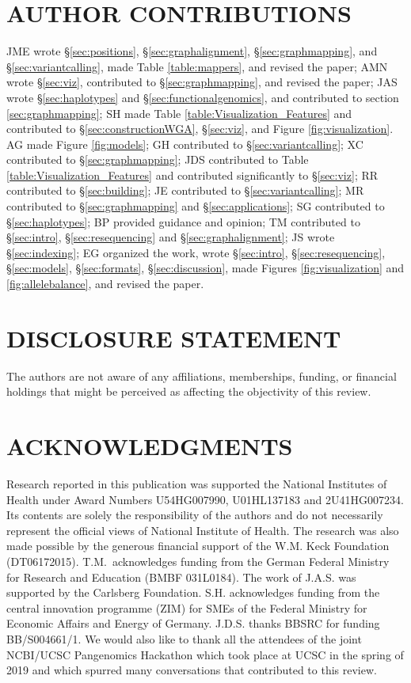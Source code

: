

\section*{AUTHOR CONTRIBUTIONS}

JME wrote \S \ref{sec:positions}, \S \ref{sec:graphalignment}, \S \ref{sec:graphmapping}, and \S \ref{sec:variantcalling}, made Table \ref{table:mappers}, and revised the paper;
AMN wrote \S \ref{sec:viz}, contributed to \S \ref{sec:graphmapping}, and revised the paper;
JAS wrote \S \ref{sec:haplotypes} and \S \ref{sec:functionalgenomics}, and contributed to section \ref{sec:graphmapping};
SH made Table \ref{table:Visualization_Features} and contributed to \S \ref{sec:constructionWGA}, \S \ref{sec:viz}, and Figure \ref{fig:visualization}.
AG made Figure \ref{fig:models};
GH contributed to \S \ref{sec:variantcalling};
XC contributed to \S \ref{sec:graphmapping};
JDS contributed to Table \ref{table:Visualization_Features} and contributed significantly to \S \ref{sec:viz};
RR contributed to \S \ref{sec:building};
JE contributed to \S \ref{sec:variantcalling};
MR contributed to \S \ref{sec:graphmapping} and \S \ref{sec:applications};
SG contributed to \S \ref{sec:haplotypes};
BP provided guidance and opinion;
TM contributed to \S \ref{sec:intro}, \S \ref{sec:resequencing} and \S \ref{sec:graphalignment};
JS wrote \S \ref{sec:indexing};
EG organized the work, wrote \S \ref{sec:intro}, \S \ref{sec:resequencing}, \S \ref{sec:models}, \S \ref{sec:formats}, \S \ref{sec:discussion}, made Figures \ref{fig:visualization} and \ref{fig:allelebalance}, and revised the paper.

\section*{DISCLOSURE STATEMENT}
The authors are not aware of any affiliations, memberships, funding, or financial holdings that
might be perceived as affecting the objectivity of this review. 

\section*{ACKNOWLEDGMENTS}
Research reported in this publication was supported the National Institutes of Health under Award Numbers U54HG007990, U01HL137183 and 2U41HG007234.
Its contents are solely the responsibility of the authors and do not necessarily represent the official views of National Institute of Health.
The research was also made possible by the generous financial support of the W.M. Keck Foundation (DT06172015).
T.M.\ acknowledges funding from the German Federal Ministry for Research and Education (BMBF 031L0184).
The work of J.A.S. was supported by the Carlsberg Foundation.
S.H. acknowledges funding from the central innovation programme (ZIM) for SMEs of the Federal Ministry for Economic Affairs and Energy of Germany.
J.D.S. thanks BBSRC for funding BB/S004661/1.
We would also like to thank all the attendees of the joint NCBI/UCSC Pangenomics Hackathon which took place at UCSC in the spring of 2019 and which spurred many conversations that contributed to this review.
